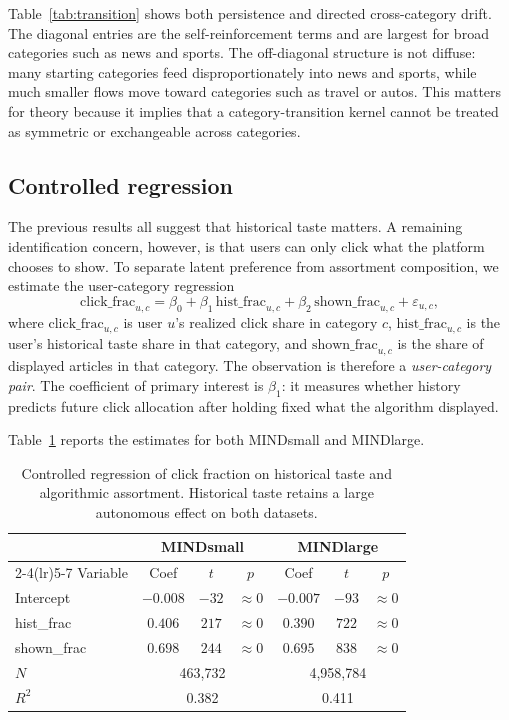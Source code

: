 \documentclass[11pt]{article}
\begin{document}
Table~\ref{tab:transition} shows both persistence and directed cross-category drift. The diagonal entries are the self-reinforcement terms and are largest for broad categories such as news and sports. The off-diagonal structure is not diffuse: many starting categories feed disproportionately into news and sports, while much smaller flows move toward categories such as travel or autos. This matters for theory because it implies that a category-transition kernel cannot be treated as symmetric or exchangeable across categories.

\subsection{Controlled regression}
\label{sec:regression}

The previous results all suggest that historical taste matters. A remaining identification concern, however, is that users can only click what the platform chooses to show. To separate latent preference from assortment composition, we estimate the user-category regression
\[
\text{click\_frac}_{u,c}
=
\beta_0
+
\beta_1\,\text{hist\_frac}_{u,c}
+
\beta_2\,\text{shown\_frac}_{u,c}
+
\varepsilon_{u,c},
\]
where $\text{click\_frac}_{u,c}$ is user $u$'s realized click share in category $c$, $\text{hist\_frac}_{u,c}$ is the user's historical taste share in that category, and $\text{shown\_frac}_{u,c}$ is the share of displayed articles in that category. The observation is therefore a \emph{user-category pair}. The coefficient of primary interest is $\beta_1$: it measures whether history predicts future click allocation after holding fixed what the algorithm displayed.

Table~\ref{tab:controlled_reg} reports the estimates for both MINDsmall and MINDlarge.

\begin{table}[ht]
\centering
\caption{Controlled regression of click fraction on historical taste and algorithmic assortment. Historical taste retains a large autonomous effect on both datasets.}
\label{tab:controlled_reg}
\begin{tabular}{lcccccc}
\toprule
 & \multicolumn{3}{c}{MINDsmall} & \multicolumn{3}{c}{MINDlarge} \\
\cmidrule(lr){2-4}\cmidrule(lr){5-7}
Variable & Coef & $t$ & $p$ & Coef & $t$ & $p$ \\
\midrule
Intercept & $-0.008$ & $-32$ & $\approx 0$ & $-0.007$ & $-93$ & $\approx 0$ \\
hist\_frac & $0.406$ & $217$ & $\approx 0$ & $0.390$ & $722$ & $\approx 0$ \\
shown\_frac & $0.698$ & $244$ & $\approx 0$ & $0.695$ & $838$ & $\approx 0$ \\
\midrule
$N$ & \multicolumn{3}{c}{463,732} & \multicolumn{3}{c}{4,958,784} \\
$R^2$ & \multicolumn{3}{c}{0.382} & \multicolumn{3}{c}{0.411} \\
\bottomrule
\end{tabular}
\end{table}
\FloatBarrier
\end{document}
